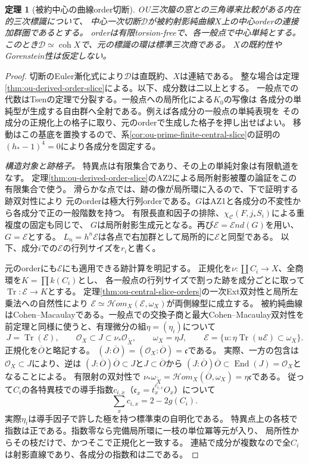 \documentclass[11pt,a4paper]{ltjsarticle}
\newtheorem{theorem}{定理}[section]
\theoremstyle{definition}
\newcommand{\coh}{\operatorname{coh}}
\begin{document}
\begin{theorem}[被約中心の曲線order切断]
\label{thm:ou-reduced-order-slice}
OU三次箙の窓との三角導来比較がある内在的三次標識について、
中心一次切断$\mathcal D$が被約射影純曲線$X$上の中心orderの連接加群圏であるとする。
orderは有限torsion-freeで、各一般点で中心単純とする。
このとき$\mathcal D\simeq\coh X$で、元の標識の環は標準三次商である。
$X$の既約性やGorenstein性は仮定しない。
\end{theorem}
\begin{proof}
切断のEuler漸化式により$\mathcal D$は直既約、$X$は連結である。
整な場合は定理\ref{thm:ou-derived-order-slice}による。以下、成分数は二以上とする。
一般点での代数はTsenの定理で分裂する。一般点への局所化による$K_0$の写像は
各成分の単純型が生成する自由群へ全射である。例えば各成分の一般点の単純表現を
その成分の正規化上の格子に取り、元のorderで生成した格子を押し出せばよい。
移動はこの基底を置換するので、系\ref{cor:ou-prime-finite-central-slice}の証明の
$(h_*-1)^4=0$により各成分を固定する。

\emph{構造対象と跡格子。}
特異点は有限集合であり、その上の単純対象は有限軌道をなす。
定理\ref{thm:ou-derived-order-slice}のAZ2による局所射影被覆の論証をこの有限集合で使う。
滑らかな点では、跡の像が局所環に入るので、下で証明する跡双対性により
元のorderは極大行列orderである。$G$はAZ1と各成分の不変性から各成分で正の一般階数を持つ。
有限長直和因子の排除、$\chi_{\mathcal C}(F,j_*S_i)$による重複度の固定も同じで、
$G$は局所射影生成元となる。再び$\mathcal E=\mathcal End(G)$を用い、$G=\mathcal E$とする。
$L_n=h^n\mathcal E$は各点で右加群として局所的に$\mathcal E$と同型である。
以下、成分$i$での$\mathcal E$の行列サイズを$r_i$と書く。

元のorderにも$\mathcal E$にも適用できる跡計算を明記する。
正規化を$\nu:\coprod C_i\to X$、全商環を$K=\prod k(C_i)$とし、
各一般点の行列サイズで割った跡を成分ごとに取って$\operatorname{Tr}:\mathcal E\to K$とする。
定理\ref{thm:ou-central-slice-orders}の一次Ext双対性と局所左乗法への自然性により
$\mathcal E\simeq\mathcal Hom_X(\mathcal E,\omega_X)$が両側線型に成立する。
被約純曲線はCohen--Macaulayである。一般点での交換子商と最大Cohen--Macaulay双対性を
前定理と同様に使うと、有理微分の組$\eta=(\eta_i)$について
\[
 J=\operatorname{Tr}(\mathcal E),\qquad
 \mathcal O_X\subset J\subset\nu_*\mathcal O_{\widetilde X},\qquad
 \omega_X=\eta J,\qquad
 \mathcal E=\{u:\eta\operatorname{Tr}(u\mathcal E)\subset\omega_X\}.
\]
正規化を$\overline O$と略記する。
$(J:\overline O)=(\mathcal O_X:\overline O)=\mathfrak c$である。
実際、一方の包含は$\mathcal O_X\subset J$により、逆は
$(J:\overline O)\overline O\subset J$と$J\subset\overline O$から
$(J:\overline O)\overline O\subset\operatorname{End}(J)=\mathcal O_X$となることによる。
有限射の双対性で
$\nu_*\omega_{\widetilde X}=\mathcal Hom_X(\overline O,\omega_X)=\eta\mathfrak c$である。
従って$C_i$の各特異枝での導手指数$c_{i,x}$（$\mathfrak c_x=t_x^{c_{i,x}}O_x$）について
\[
                 \sum_x c_{i,x}=2-2g(C_i).
\]
実際$\eta_i$は導手因子で許した極を持つ標準束の自明化である。
特異点上の各枝で指数は正である。指数零なら完備局所環に一枝の単位冪等元が入り、
局所性からその枝だけで、かつそこで正規化と一致する。
連結で成分が複数なので全$C_i$は射影直線であり、各成分の指数和は二である。


\end{proof}
\end{document}
